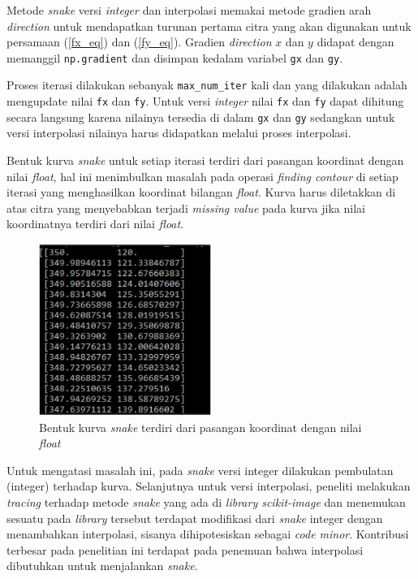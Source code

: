 Metode \emph{snake} versi \emph{integer} dan interpolasi memakai metode gradien arah \emph{direction} untuk mendapatkan turunan pertama citra yang akan digunakan untuk persamaan (\ref{fx_eq}) dan (\ref{fy_eq}). Gradien \emph{direction} $x$ dan $y$ didapat dengan memanggil \texttt{np.gradient} dan disimpan kedalam variabel \texttt{gx} dan \texttt{gy}.

Proses iterasi dilakukan sebanyak \texttt{max\_num\_iter} kali dan yang dilakukan adalah mengupdate nilai \texttt{fx} dan \texttt{fy}. Untuk versi \emph{integer} nilai \texttt{fx} dan \texttt{fy} dapat dihitung secara langsung karena nilainya tersedia di dalam \texttt{gx} dan \texttt{gy} sedangkan untuk versi interpolasi nilainya harus didapatkan melalui proses interpolasi. 

Bentuk kurva \emph{snake} untuk setiap iterasi terdiri dari pasangan koordinat dengan nilai \emph{float}, hal ini menimbulkan masalah pada operasi \emph{finding contour} di setiap iterasi yang menghasilkan koordinat bilangan \emph{float}. Kurva harus diletakkan di atas citra yang menyebabkan terjadi \emph{missing value} pada kurva jika nilai koordinatnya terdiri dari nilai \emph{float}. 
\begin{figure}[H]
	\centering
	\includegraphics[width=0.5\textwidth]{gambar/curve_vector}
	\caption{Bentuk kurva \emph{snake} terdiri dari pasangan koordinat dengan nilai \emph{float} }
	\label{Gambar:snake_float}
\end{figure}
Untuk mengatasi masalah ini, pada \emph{snake} versi integer dilakukan pembulatan (integer) terhadap kurva.
Selanjutnya untuk versi interpolasi, peneliti melakukan \emph{tracing} terhadap metode \emph{snake} yang ada di \emph{library scikit-image} dan menemukan sesuatu pada \emph{library} tersebut terdapat modifikasi dari \emph{snake} integer dengan menambahkan interpolasi, sisanya dihipotesiskan sebagai \emph{code minor}. Kontribusi terbesar pada penelitian ini terdapat pada penemuan bahwa interpolasi dibutuhkan untuk menjalankan \emph{snake}. 

